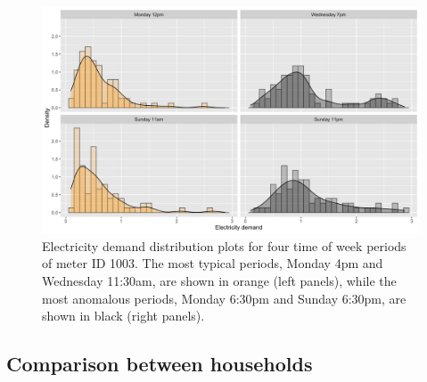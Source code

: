 \documentclass{article}
\begin{document}
\begin{figure}

{\centering \includegraphics[width=1\linewidth]{figures/electricity_compare2tow_1id336tow} 

}

\caption{Electricity demand distribution plots for four time of week periods of meter ID 1003. The most typical periods, Monday 4pm and Wednesday 11:30am, are shown in orange (left panels), while the most anomalous periods, Monday 6:30pm and Sunday 6:30pm, are shown in black (right panels). }\label{fig:compare2tow}
\end{figure}

\hypertarget{comparison-between-households}{%
\subsection{Comparison between
households}\label{comparison-between-households}}
\end{document}

